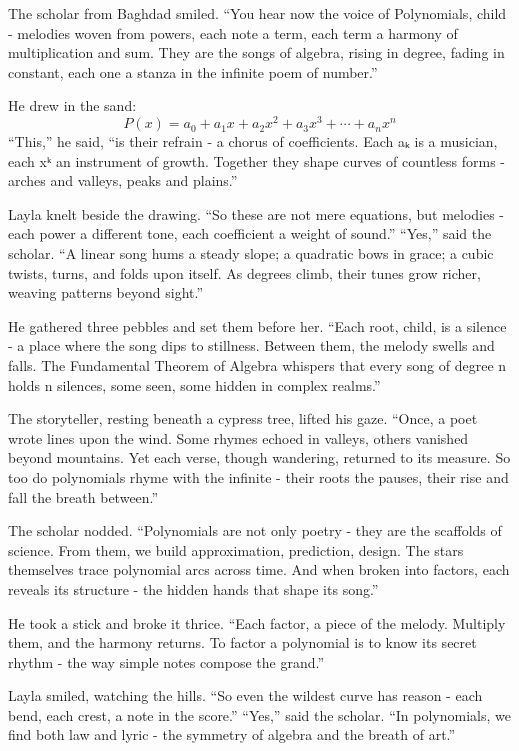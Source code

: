 \documentclass[
  letterpaper,
  DIV=11,
  numbers=noendperiod]{scrreprt}
\begin{document}
The scholar from Baghdad smiled. ``You hear now the voice of
Polynomials, child - melodies woven from powers, each note a term, each
term a harmony of multiplication and sum. They are the songs of algebra,
rising in degree, fading in constant, each one a stanza in the infinite
poem of number.''

He drew in the sand: \[
P(x) = a_0 + a_1x + a_2x^2 + a_3x^3 + \cdots + a_nx^n
\] ``This,'' he said, ``is their refrain - a chorus of coefficients.
Each aₖ is a musician, each xᵏ an instrument of growth. Together they
shape curves of countless forms - arches and valleys, peaks and
plains.''

Layla knelt beside the drawing. ``So these are not mere equations, but
melodies - each power a different tone, each coefficient a weight of
sound.'' ``Yes,'' said the scholar. ``A linear song hums a steady slope;
a quadratic bows in grace; a cubic twists, turns, and folds upon itself.
As degrees climb, their tunes grow richer, weaving patterns beyond
sight.''

He gathered three pebbles and set them before her. ``Each root, child,
is a silence - a place where the song dips to stillness. Between them,
the melody swells and falls. The Fundamental Theorem of Algebra whispers
that every song of degree n holds n silences, some seen, some hidden in
complex realms.''

The storyteller, resting beneath a cypress tree, lifted his gaze.
``Once, a poet wrote lines upon the wind. Some rhymes echoed in valleys,
others vanished beyond mountains. Yet each verse, though wandering,
returned to its measure. So too do polynomials rhyme with the infinite -
their roots the pauses, their rise and fall the breath between.''

The scholar nodded. ``Polynomials are not only poetry - they are the
scaffolds of science. From them, we build approximation, prediction,
design. The stars themselves trace polynomial arcs across time. And when
broken into factors, each reveals its structure - the hidden hands that
shape its song.''

He took a stick and broke it thrice. ``Each factor, a piece of the
melody. Multiply them, and the harmony returns. To factor a polynomial
is to know its secret rhythm - the way simple notes compose the grand.''

Layla smiled, watching the hills. ``So even the wildest curve has reason
- each bend, each crest, a note in the score.'' ``Yes,'' said the
scholar. ``In polynomials, we find both law and lyric - the symmetry of
algebra and the breath of art.''
\end{document}
